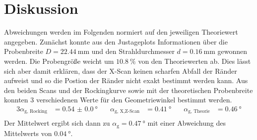 \section{Diskussion}
  \label{sec:Diskussion}
Abweichungen werden im Folgenden normiert auf den jeweiligen Theoriewert angegeben.
Zunächst konnte aus den Justageplots Informationen über die Probenbreite $D=\SI{22.44}{\milli\meter}$ und den Strahldurchmesser $d=\SI{0.16}{\milli\meter}$ gewonnen werden.
Die Probengröße weicht um $\SI{10.8}{\percent}$ von den Theoriewerten ab. Dies lässt sich aber damit erklären, dass der X-Scan keinen scharfen Abfall der Ränder aufweist und so die 
Postion der Ränder nicht exakt bestimmt werden kann. Aus den beiden Scans und der Rockingkurve sowie mit der theoretischen Probenbreite konnten 3 verschiedenen 
Werte für den Geometriewinkel bestimmt werden.
\begin{alignat}{3}
  \alpha_\text{g, Rocking} &= \SI{0.54(0)}{\degree} \quad & \alpha_\text{g, X,Z-Scan} &= \SI{0.41}{\degree} \quad & \alpha_\text{g, Theorie} &= \SI{0.46}{\degree} \\
\end{alignat}
Der Mittelwert ergibt sich dann zu $\alpha_\text{g} = \SI{0.47}{\degree}$ mit einer Abweichung des Mittelwerts von $\SI{0.04}{\degree}$.

